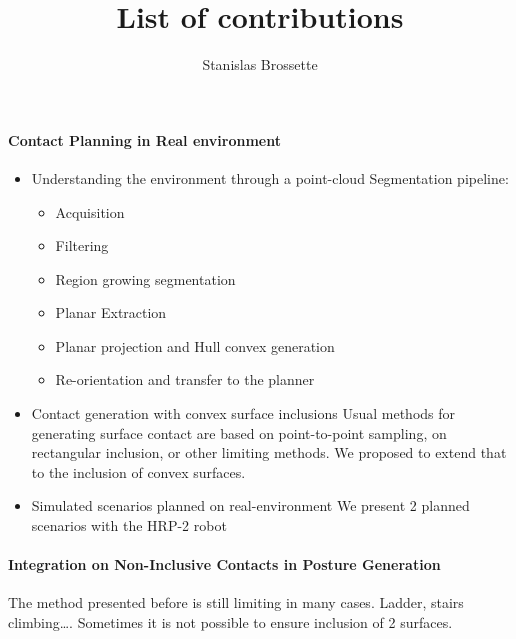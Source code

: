 \documentclass{article}
\begin{document}
\title{List of contributions}
\author{Stanislas Brossette}

\maketitle

\paragraph {Contact Planning in Real environment}
\begin{itemize}
  \item Understanding the environment through a point-cloud
    Segmentation pipeline:
    \begin{itemize}
      \item Acquisition
      \item Filtering
      \item Region growing segmentation
      \item Planar Extraction
      \item Planar projection and Hull convex generation
      \item Re-orientation and transfer to the planner
    \end{itemize}

  \item Contact generation with convex surface inclusions
Usual methods for generating surface contact are based on point-to-point sampling, on rectangular inclusion, or other limiting methods. We proposed to extend that to the inclusion of convex surfaces.
  \item{Simulated scenarios planned on real-environment}
We present 2 planned scenarios with the HRP-2 robot
\end{itemize}




\paragraph{Integration on Non-Inclusive Contacts in Posture Generation}

The method presented before is still limiting in many cases. Ladder, stairs climbing\dots.
Sometimes it is not possible to ensure inclusion of 2 surfaces.
\end{document}
